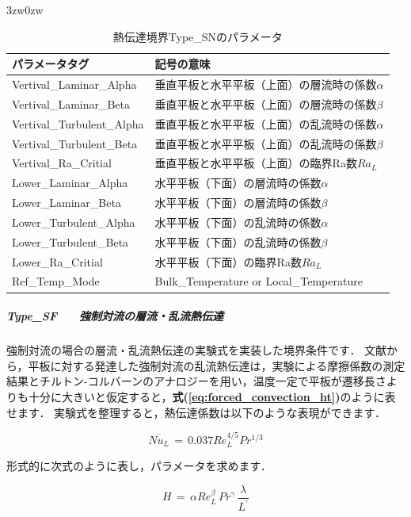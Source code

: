 \begin{indentation}{3zw}{0zw}
\begin{table}[htdp]
\caption{熱伝達境界Type\_SNのパラメータ}
\begin{center}
\small
\begin{tabular}{ll}\toprule
パラメータタグ & 記号の意味\\ \midrule
Vertival\_Laminar\_Alpha & 垂直平板と水平平板（上面）の層流時の係数$\alpha$\\
Vertival\_Laminar\_Beta & 垂直平板と水平平板（上面）の層流時の係数$\beta$\\
Vertival\_Turbulent\_Alpha & 垂直平板と水平平板（上面）の乱流時の係数$\alpha$\\
Vertival\_Turbulent\_Beta & 垂直平板と水平平板（上面）の乱流時の係数$\beta$\\
Vertival\_Ra\_Critial & 垂直平板と水平平板（上面）の臨界Ra数$Ra_L$\\
Lower\_Laminar\_Alpha & 水平平板（下面）の層流時の係数$\alpha$\\
Lower\_Laminar\_Beta & 水平平板（下面）の層流時の係数$\beta$\\
Lower\_Turbulent\_Alpha & 水平平板（下面）の乱流時の係数$\alpha$\\
Lower\_Turbulent\_Beta & 水平平板（下面）の乱流時の係数$\beta$\\
Lower\_Ra\_Critial & 水平平板（下面）の臨界Ra数$Ra_L$\\ 
Ref\_Temp\_Mode & Bulk\_Temperature or Local\_Temperature\\ \bottomrule
\end{tabular}
\end{center}
\label{tbl:htsn}
\end{table}


%
\subparagraph{Type\_SF　　強制対流の層流・乱流熱伝達}
強制対流の場合の層流・乱流熱伝達の実験式を実装した境界条件です．
文献\cite{shouji:95:Dennetsu}から，平板に対する発達した強制対流の乱流熱伝達は，実験による摩擦係数の測定結果とチルトン-コルバーンのアナロジーを用い，温度一定で平板が遷移長さよりも十分に大きいと仮定すると，\textbf{式(\ref{eq:forced_convection_ht})}のように表せます．
実験式を整理すると，熱伝達係数は以下のような表現ができます．

\begin{equation}
\overline{Nu_L} \,=\, 0.037Re_L^{4/5}Pr^{1/3}
\label{eq:forced_convection_ht}
\end{equation}

形式的に次式のように表し，パラメータを求めます．

\begin{equation}
H \,=\, \alpha Re_L^\beta \, Pr^\gamma \, \frac{\lambda}{L^\prime}
\label{eq:typeSF_form_ht}
\end{equation}



\end{indentation}
